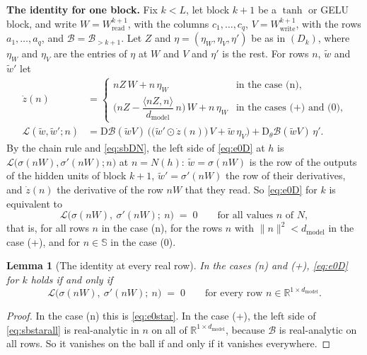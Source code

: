 \documentclass[10pt]{article}
\newtheorem{lemma}[theorem]{Lemma}
\theoremstyle{definition}
\theoremstyle{remark}
\newcommand{\R}{\mathbb{R}}
\newcommand{\Wread}{W_{\mathrm{read}}}
\newcommand{\Wwrite}{W_{\mathrm{write}}}
\newcommand{\dm}{d_{\mathrm{model}}}
\newcommand{\Der}{\mathrm{D}}
\newcommand{\norm}[1]{\lVert #1\rVert}
\newcommand{\para}[1]{\smallskip\noindent\textbf{#1}\hspace{0.5em}}
\begin{document}
\para{The identity for one block.} Fix $k < L$, let block $k+1$ be a $\tanh$ or GELU block, and write $W = \Wread^{k+1}$, with the columns $c_1, \dots, c_q$, $V = \Wwrite^{k+1}$, with the rows $a_1, \dots, a_q$, and $\mathcal B = \mathcal B_{>k+1}$. Let $Z$ and $\eta = (\eta_W, \eta_V, \eta')$ be as in $(D_k)$, where $\eta_W$ and $\eta_V$ are the entries of $\eta$ at $W$ and $V$ and $\eta'$ is the rest. For rows $n$, $\tilde w$ and $\tilde w'$ let
\begin{align}
\dot z(n) &= \begin{cases} nZ\,W + n\,\eta_W & \text{in the case (n),}\\[3pt] \Big(nZ - \dfrac{\langle nZ, n\rangle}{\dm}\,n\Big)\,W + n\,\eta_W & \text{in the cases (+) and (0),}\end{cases} \label{eq:e0zdot}\\[2pt]
\mathcal L(\tilde w, \tilde w'; n) &= \Der\mathcal B(\tilde wV)\,\Big(\big(\tilde w'\odot\dot z(n)\big)\,V + \tilde w\,\eta_V\Big) + \Der_\theta\mathcal B(\tilde wV)\,\eta' . \label{eq:e0L}
\end{align}
By the chain rule and \eqref{eq:sbDN}, the left side of \eqref{eq:e0D} at $h$ is $\mathcal L\big(\sigma(nW), \sigma'(nW); n\big)$ at $n = N(h)$: $\tilde w = \sigma(nW)$ is the row of the outputs of the hidden units of block $k+1$, $\tilde w' = \sigma'(nW)$ the row of their derivatives, and $\dot z(n)$ the derivative of the row $nW$ that they read. So \eqref{eq:e0D} for $k$ is equivalent to
\begin{equation}\label{eq:e0star}
\mathcal L\big(\sigma(nW),\ \sigma'(nW);\ n\big) \;=\; 0 \qquad\text{for all values } n \text{ of } N,
\end{equation}
that is, for all rows $n$ in the case (n), for the rows $n$ with $\norm{n}^2 < \dm$ in the case (+), and for $n \in \mathbb S$ in the case (0).

\begin{lemma}[The identity at every real row]\label{lem:sballrows}
In the cases (n) and (+), \eqref{eq:e0D} for $k$ holds if and only if
\begin{equation}\label{eq:sbstarall}
\mathcal L\big(\sigma(nW),\ \sigma'(nW);\ n\big) \;=\; 0 \qquad\text{for every row } n \in \R^{1\times\dm} .
\end{equation}
\end{lemma}

\begin{proof}
In the case (n) this is \eqref{eq:e0star}. In the case (+), the left side of \eqref{eq:sbstarall} is real-analytic in $n$ on all of $\R^{1\times\dm}$, because $\mathcal B$ is real-analytic on all rows. So it vanishes on the ball if and only if it vanishes everywhere.
\end{proof}
\end{document}
